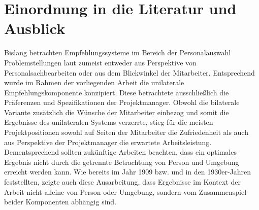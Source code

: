 \section{Einordnung in die Literatur und Ausblick}
\label{ch:diskussion:einordnung}
Bislang betrachten Empfehlungssysteme im Bereich der Personalauswahl Problemstellungen laut \textcite{malinowski:2008} zumeist entweder aus Perspektive von Personalsachbearbeiten oder aus dem Blickwinkel der Mitarbeiter. Entsprechend wurde im Rahmen der vorliegenden Arbeit die unilaterale Empfehlungskomponente konzipiert. Diese betrachtete ausschließlich die Präferenzen und Spezifikationen der Projektmanager. Obwohl die bilaterale Variante zusätzlich die Wünsche der Mitarbeiter einbezog und somit die Ergebnisse des unilateralen Systems verzerrte, stieg für die meisten Projektpositionen sowohl auf Seiten der Mitarbeiter die Zufriedenheit als auch aus Perspektive der Projektmanager die erwartete Arbeitsleistung. Dementsprechend sollten zukünftige Arbeiten beachten, dass ein optimales Ergebnis nicht durch die getrennte Betrachtung von Person und Umgebung erreicht werden kann. Wie bereits \textcite[S. 5ff.]{parsons:1909} im Jahr 1909 bzw. \textcite[S. 11f.]{lewin:1936} und \textcite[S. 38ff.]{murray:1938} in den 1930er-Jahren feststellten, zeigte auch diese Ausarbeitung, dass Ergebnisse im Kontext der Arbeit nicht alleine von Person oder Umgebung, sondern vom Zusammenspiel beider Komponenten abhängig sind.
